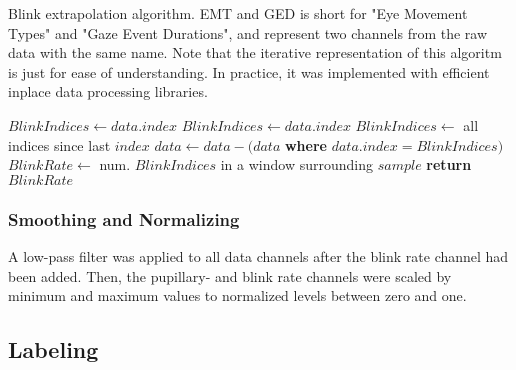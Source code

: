 \begin{algorithm}
    \caption{Blink extrapolation algorithm. EMT and GED is short for "Eye Movement Types" and "Gaze Event Durations", and represent two channels from the raw data with the same name. Note that the iterative representation of this algoritm is just for ease of understanding. In practice, it was implemented with efficient inplace data processing libraries.}
    \label{alg:impl/blink_extrapolation}
    \begin{algorithmic}[1]
                    \State $BlinkIndices \gets data.index$
                \EndIf
            \EndFor
            \State
                            \State $BlinkIndices \gets data.index$
                        \EndIf
                    \EndIf
                \EndFor
                        \State $BlinkIndices \gets$ all indices since last $index$
                    \EndIf
                \EndFor
            \EndFor
            \State
            \State $data \gets data - (data$ \textbf{where} $data.index = BlinkIndices)$
            \State
                \State $BlinkRate \gets $ num. $BlinkIndices$ in a window surrounding $sample$
            \EndFor
            \State
            \State \textbf{return} $BlinkRate$
        \EndProcedure
    \end{algorithmic}
\end{algorithm}

\subsubsection{Smoothing and Normalizing}

A low-pass filter was applied to all data channels after the blink rate channel had been added. Then, the pupillary- and blink rate channels were scaled by minimum and maximum values to normalized levels between zero and one.

\subsection{Labeling} \label{sec:impl/dataset/labeling}

